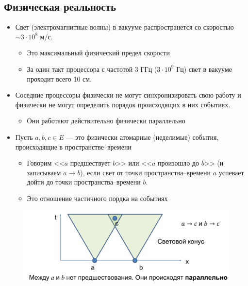 \documentclass[10pt,a4paper,oneside,titlepage]{article}
\begin{document}
\subsection{Физическая реальность}
\begin{itemize}
	\item Свет (электромагнитные волны) в вакууме распространется со скоростью $\sim3\cdot10^8$ м/с.
	\begin{itemize}
		\item Это максимальный физический предел скорости
		\item За один такт процессора с частотой 3 ГГц ($3\cdot10^9$ Гц) свет в вакууме проходит всего 10 см.
	\end{itemize}
    \item Соседние процессоры физически не могут синхронизировать свою работу и физически не могут определить порядок происходящих в них событиях.
    \begin{itemize}
    	\item Они работают действительно физически параллельно
    \end{itemize}
    \item Пусть $a, b, c\in E$ --- это физически атомарные (неделимые) события, происходящие в пространстве--времени
    \begin{itemize}
    	\item Говорим <<$a$ предшествует $b$>> или <<$a$ произошло до $b$>> (и записываем $a\to b$), если свет от точки пространства--времени $a$ успевает дойти до точки пространства--времени $b$.
    	\item Это отношение частичного пордка на событиях
    \end{itemize}
\end{itemize}

\begin{figure}[h!]
	\centering
	\includegraphics[width=0.4\linewidth]{pictures/Model2}
	\caption{}
	\label{fig:model2}
\end{figure}
\end{document}
